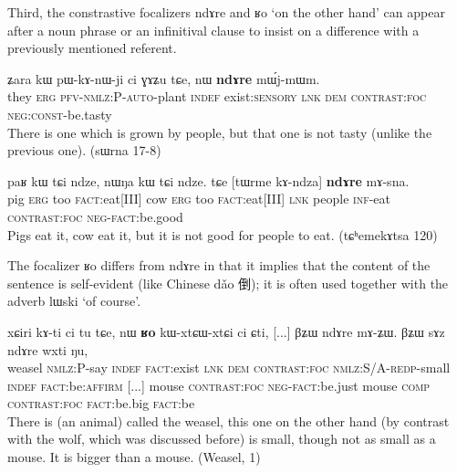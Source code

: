 \documentclass[oldfontcommands,oneside,a4paper,11pt]{article}
\newcommand{\ipa}[1]{{\phon \mbox{#1}}} %
\newcommand{\zh}[1]{{\cn #1}}
\begin{document}
Third, the constrastive focalizers \ipa{ndɤre}  and \ipa{ʁo}  `on the other hand' can appear after a noun phrase or an infinitival clause to insist on a difference with a previously mentioned referent.


\begin{exe}
\ex \label{ex:ndAre.mWjmWm}
\gll
\ipa{ʑara}  	\ipa{kɯ}  	\ipa{pɯ-kɤ-nɯ-ji}  	\ipa{ci}  	\ipa{ɣɤʑu}  	\ipa{tɕe,}  	\ipa{nɯ}  	\ipa{\textbf{ndɤre}}  	\ipa{mɯ́j-mɯm.}  \\
they \textsc{erg} \textsc{pfv-nmlz:P-auto}-plant \textsc{indef} exist:\textsc{sensory} \textsc{lnk} \textsc{dem} \textsc{contrast:foc} \textsc{neg:const}-be.tasty \\
\glt There is one which is grown by people, but that one is not tasty (unlike the previous one). (sɯrna 17-8)
\end{exe}

\begin{exe}
\ex \label{ex:ndAre.mAsna}
\gll
\ipa{paʁ}    	\ipa{kɯ}    	\ipa{tɕi}    	\ipa{ndze,}    	\ipa{nɯŋa}    	\ipa{kɯ}    	\ipa{tɕi}    	\ipa{ndze.}    	\ipa{tɕe}    	[\ipa{tɯrme}    	\ipa{kɤ-ndza}]    	\ipa{\textbf{ndɤre}}    	\ipa{mɤ-sna.}    \\
pig \textsc{erg} too \textsc{fact}:eat[III] cow  \textsc{erg} too \textsc{fact}:eat[III] \textsc{lnk} people \textsc{inf}-eat  \textsc{contrast:foc}  \textsc{neg-fact}:be.good \\
\glt Pigs eat it, cow eat it, but it is not good for people to eat. (tɕʰemekɤtsa 120)
\end{exe}

The focalizer \ipa{ʁo} differs from \ipa{ndɤre} in that it implies that the content of the sentence is self-evident (like Chinese \ipa{dǎo} \zh{倒}); it is often used together with the adverb \ipa{lɯski} `of course'.

\begin{exe}
\ex \label{ex:Ro.ndAre}
\gll
\ipa{xɕiri}    	\ipa{kɤ-ti}    	\ipa{ci}    	\ipa{tu}    	\ipa{tɕe,}    	\ipa{nɯ}    	\ipa{\textbf{ʁo}}    	\ipa{kɯ-xtɕɯ-xtɕi}    	\ipa{ci}    	\ipa{ɕti,}    	 [...] 	\ipa{βʑɯ}    	\ipa{ndɤre}    	\ipa{mɤ-ʑɯ.}    	\ipa{βʑɯ}    	\ipa{sɤz}    	\ipa{ndɤre}    	\ipa{wxti}    	\ipa{ŋu,}   \\
weasel \textsc{nmlz:P}-say \textsc{indef} \textsc{fact}:exist \textsc{lnk} \textsc{dem} \textsc{contrast:foc} \textsc{nmlz:S/A-redp}-small \textsc{indef} \textsc{fact}:be:\textsc{affirm} [...] mouse \textsc{contrast:foc} \textsc{neg-fact}:be.just mouse \textsc{comp} \textsc{contrast:foc} \textsc{fact}:be.big \textsc{fact}:be \\
\glt There is (an animal) called the weasel, this one on the other hand (by contrast with the wolf, which was discussed before) is small, though not as small as a mouse. It is bigger than a mouse. (Weasel, 1)
\end{exe}
\end{document}
